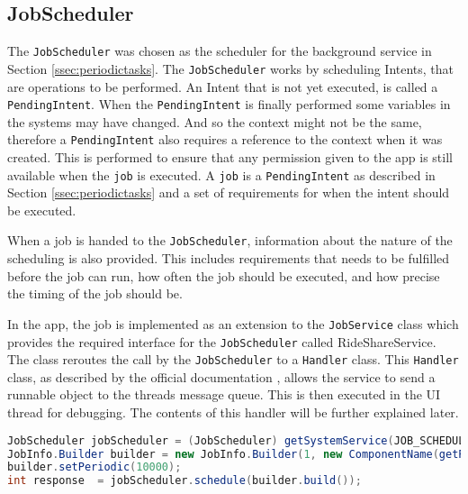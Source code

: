 \subsection{JobScheduler}
The \texttt{JobScheduler} was chosen as the scheduler for the background service in Section \ref{ssec:periodictasks}.
The \texttt{JobScheduler} works by scheduling Intents, that are operations to be performed. %
An Intent that is not yet executed, is called a \texttt{PendingIntent}.
When the \texttt{PendingIntent} is finally performed some variables in the systems may have changed.
And so the context might not be the same, therefore a \texttt{PendingIntent} also requires a reference to the context when it was created.
This is performed to ensure that any permission given to the app is still available when the \texttt{job} is executed.
A \texttt{job} is a \texttt{PendingIntent} as described in Section \ref{ssec:periodictasks} and a set of requirements for when the intent should be executed.

When a job is handed to the \texttt{JobScheduler}, information about the nature of the scheduling is also provided.
This includes requirements that needs to be fulfilled before the job can run, how often the job should be executed, and how precise the timing of the job should be.


In the app, the job is implemented as an extension to the \texttt{JobService} class which provides the required interface for the \texttt{JobScheduler} called RideShareService.
The class reroutes the call by the \texttt{JobScheduler} to a \texttt{Handler} class.
This \texttt{Handler} class, as described by the official documentation \cite{handler}, allows the service to send a runnable object to the threads message queue.
This is then executed in the UI thread for debugging.
The contents of this handler will be further explained later. 

\begin{lstlisting}[language=Java]
JobScheduler jobScheduler = (JobScheduler) getSystemService(JOB_SCHEDULER_SERVICE);
JobInfo.Builder builder = new JobInfo.Builder(1, new ComponentName(getPackageName(), RideShareService.class.getName()));
builder.setPeriodic(10000);
int response  = jobScheduler.schedule(builder.build());	
\end{lstlisting}

